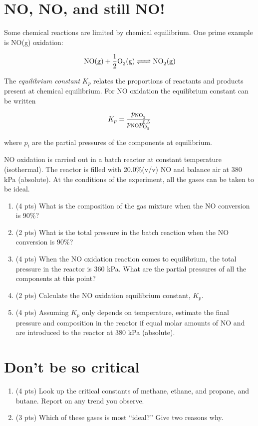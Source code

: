 \documentclass[11pt]{article}
\begin{document}
\section{NO, NO, and still NO!}
\label{sec-3}
Some chemical reactions are limited by chemical equilibrium.  One prime example is NO(g) oxidation:

\[ \ce{NO (g) + 1/2 O2 (g) <=> NO2 (g)} \]

\noindent The \emph{equilibrium constant} \(K_{p}\) relates the proportions of reactants and products present at chemical equilibrium.  For NO oxidation the equilibrium constant can be written

\[ K_{p} = \frac{p_{\ce{NO2}}}{p_{\ce{NO}}p_{\ce{O2}}^{0.5}}\]

\noindent where \(p_{i}\) are the partial pressures of the components at equilibrium.

NO oxidation is carried out in a batch reactor at constant temperature
(isothermal).  The reactor is filled with 20.0\%(v/v) NO and balance air at 380
kPa (absolute).  At the conditions of the experiment, all the gases can be taken
to be ideal.

\begin{enumerate}
\item (4 pts) What is the composition of the gas mixture when the NO conversion is 90\%?
\item (2 pts) What is the total pressure in the batch reaction when the NO conversion is 90\%?
\item (4 pts) When the NO oxidation reaction comes to equilibrium, the total pressure in the reactor is 360 kPa.  What are the partial pressures of all the components at this point?
\item (2 pts)  Calculate the NO oxidation equilibrium constant, \(K_{p}\).

\item (4 pts) Assuming \(K_{p}\) only depends on temperature, estimate the final pressure and composition in the reactor if equal molar amounts of NO and  are introduced to the reactor at 380 kPa (absolute).
\end{enumerate}

\section{Don't be so critical}
\label{sec-4}
\begin{enumerate}
\item (4 pts) Look up the critical constants of methane, ethane, and propane, and butane.  Report on any trend you observe.
\item (3 pts) Which of these gases is most ``ideal?''  Give two reasons why.
\end{enumerate}
\end{document}
